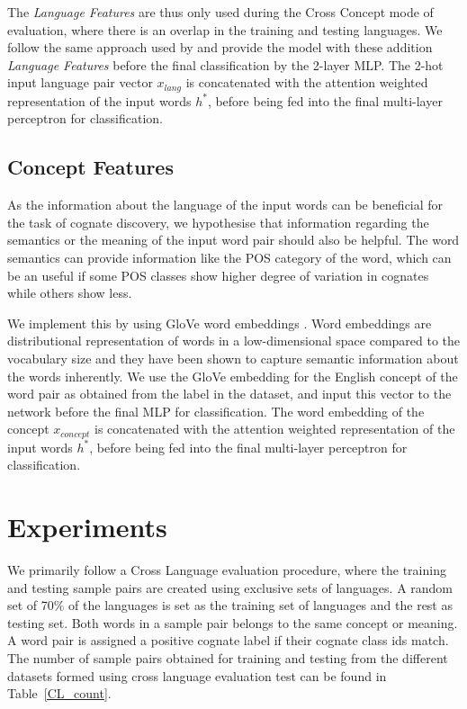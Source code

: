 \documentclass[11pt,letterpaper]{article}
\begin{document}
The \textit{Language Features} are thus only used during the Cross Concept mode of evaluation, where there is an overlap in the training and testing languages. We follow the same approach used by \cite{rama2016siamese} and provide the model with these addition \textit{Language Features} before the final classification by the 2-layer MLP. The 2-hot input language pair vector $x_{lang}$ is concatenated with the attention weighted representation of the input words $h^{*}$, before being fed into the final multi-layer perceptron for classification.

\subsection{Concept Features}

As the information about the language of the input words can be beneficial for the task of cognate discovery, we hypothesise that information regarding the semantics or the meaning of the input word pair should also be helpful. The word semantics can provide information like the POS category of the word, which can be an useful if some POS classes show higher degree of variation in cognates while others show less.

We implement this by using GloVe word embeddings \cite{pennington2014glove}. Word embeddings are distributional representation of words in a low-dimensional space compared to the vocabulary size and they have been shown to capture semantic information about the words inherently. We use the GloVe embedding for the English concept of the word pair as obtained from the label in the dataset, and input this vector to the network before the final MLP for classification. The word embedding of the concept $x_{concept}$ is concatenated with the attention weighted representation of the input words $h^{*}$, before being fed into the final multi-layer perceptron for classification.

\section{Experiments}

We primarily follow a Cross Language evaluation procedure, where the training and testing sample pairs are created using exclusive sets of languages. A random set of 70\% of the languages is set as the training set of languages and the rest as testing set. Both words in a sample pair belongs to the same concept or meaning. A word pair is assigned a positive cognate label if their cognate class ids match. The number of sample pairs obtained for training and testing from the different datasets formed using cross language evaluation test can be found in Table~\ref{CL_count}. 
\end{document}
